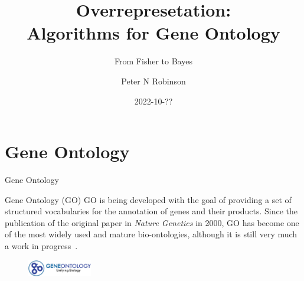 \documentclass{beamer}
\title{Overrepresetation: \\ Algorithms for Gene Ontology}
\subtitle{From Fisher to Bayes}
\author{Peter N Robinson}
\institute{The Jackson Laboratory \\ Farmington CT}
\date{2022-10-??}
\begin{document}

\begin{frame}
	\maketitle %
\end{frame}


\section{Gene Ontology} %


\begin{frame}{Gene Ontology}
    \begin{mybluebox}{Gene Ontology (GO)}
    GO is being developed with the goal of providing a
    set of structured vocabularies for the annotation of genes and their products. Since    	the publication  of the original paper in \emph{Nature Genetics} in 2000, GO
    has become one of the most widely used and mature bio-ontologies,
    although it is still very much a work in progress~\cite{GO2019}.
    \end{mybluebox}
    
    \begin{figure}
     \centering
     \includegraphics[width=0.25\textwidth]{./img/GOlogo.png}
    \end{figure}
    
\end{frame}

\end{document}
